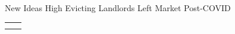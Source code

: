 \documentclass[10pt, xcolor=dvipsnames]{beamer}
\begin{document}
\begin{frame}{New Ideas}
    High Evicting Landlords Left Market Post-COVID
    \tiny
    \begin{table}[]
        \centering
        \begin{tabular}{c|c}
             &  \\
             & 
        \end{tabular}
        
        \label{tab:placeholder}
    \end{table}
    
\end{frame}
\end{document}
